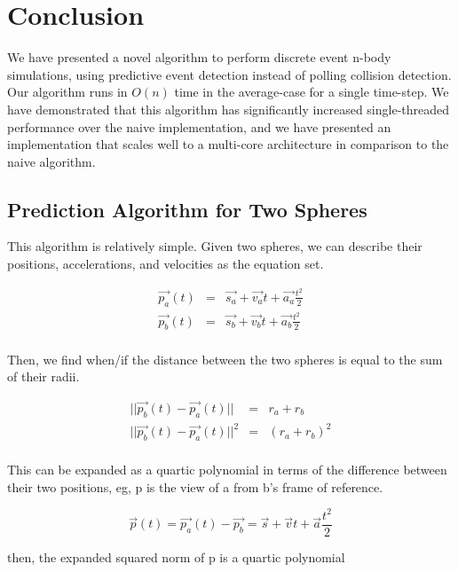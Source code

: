 \documentclass[CEJCS,PDF]{cej} %
\begin{document}
\section{Conclusion} 

We have presented a novel algorithm to perform discrete event n-body simulations, using predictive event detection instead of polling collision detection.  Our algorithm runs in $O(n)$ time in the average-case for a single time-step.  We have demonstrated that this algorithm has significantly increased single-threaded performance over the naive implementation, and we have presented an implementation that scales well to a multi-core architecture in comparison to the naive algorithm.




\appendix %
\subsection{Prediction Algorithm for Two Spheres}
\label{predict}
This algorithm is relatively simple.  Given two spheres, we can describe their positions, accelerations, and velocities as the equation set.

\begin{eqnarray*}
\vec{p_a}(t)&=&\vec{s_a}+\vec{v_a} t+\vec{a_a} \frac{t ^ 2}{2} \\
\vec{p_b}(t)&=&\vec{s_b}+\vec{v_b} t+\vec{a_b} \frac{t ^ 2}{2} \\
\end{eqnarray*}

Then, we find when/if the distance between the two spheres is equal to the sum of their radii.  

\begin{eqnarray*}
|| \vec{p_b}(t)-\vec{p_a}(t) ||&=&r_a+r_b \\
|| \vec{p_b}(t)-\vec{p_a}(t) || ^ 2&=&(r_a+r_b) ^ 2 \\
\end{eqnarray*}

This can be expanded as a quartic polynomial in terms of the difference between their two positions, eg, p is the view of a from b's frame of reference.
  
\begin{equation}
\vec{p}(t)=\vec{p_a}(t)-\vec{p_b}=\vec{s}+\vec{v} t+\vec{a} \frac{t ^ 2}{2}
\end{equation}

then, the expanded squared norm of p is a quartic polynomial
\end{document}
